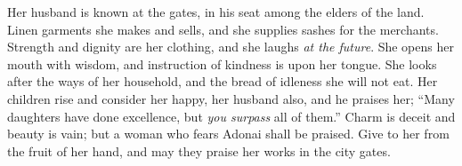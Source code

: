 \begin{biblechapter}
\verse Her husband is known at the gates, 
in his seat among the elders of the land.
\verse Linen garments she makes and sells, 
and she supplies sashes for the merchants.
\verse Strength and dignity are her clothing, 
and she laughs \textit{at the future}.
\verse She opens her mouth with wisdom, 
and instruction of kindness is upon her tongue.
\verse She looks after the ways of her household, 
and the bread of idleness she will not eat.
\verse Her children rise and consider her happy, 
her husband also, and he praises her;
\verse “Many daughters have done excellence, 
but \textit{you surpass} all of them.”
\verse Charm is deceit and beauty is vain; 
but a woman who fears Adonai shall be praised.
\verse Give to her from the fruit of her hand, 
and may they praise her works in the city gates.
\end{biblechapter}

